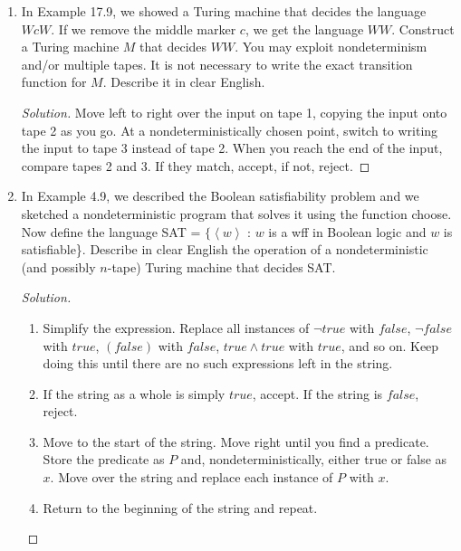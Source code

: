 \documentclass[10pt]{article}
\newcommand{\brackets}[1]{\left< #1 \right>}
\begin{document}
\begin{enumerate}[1)]

\item
In Example 17.9, we showed a Turing machine that decides the language $WcW$.  If we remove the middle 
marker $c$, we get the language $WW$.  Construct a Turing machine $M$ that decides $WW$.  You may exploit 
nondeterminism and/or multiple tapes.  It is not necessary to write the exact transition function for $M$.  Describe 
it in clear English.
\begin{proof}[Solution]
Move left to right over the input on tape 1, copying the input onto tape 2 as you go.  At a nondeterministically chosen point, switch to writing the input to tape 3 instead of tape 2.  When you reach the end of the input, compare tapes 2 and 3.  If they match, accept, if not, reject.
\end{proof}

\pagebreak

\item
In Example 4.9, we described the Boolean satisfiability problem and we sketched a nondeterministic program 
that solves it using the function choose.  Now define the language SAT = $\{\brackets{w}$ : $w$ is a wff in Boolean logic 
and $w$ is satisfiable\}.  Describe in clear English the operation of a nondeterministic (and possibly $n$-tape) Turing 
machine that decides SAT.
\begin{proof}[Solution]$ $\\
\begin{enumerate}[1.]
\item
Simplify the expression.  Replace all instances of $\lnot true$ with $false$, $\lnot false$ with $true$, $(false)$ with $false$, $true \land true$ with $true$, and so on. Keep doing this until there are no such expressions left in the string.

\item
If the string as a whole is simply $true$, accept.  If the string is $false$, reject.

\item
Move to the start of the string.  Move right until you find a predicate.  Store the predicate as $P$ and, nondeterministically, either true or false as $x$.  Move over the string and replace each instance of $P$ with $x$.

\item
Return to the beginning of the string and repeat.
\end{enumerate}
\end{proof}


\end{enumerate}
\end{document}
